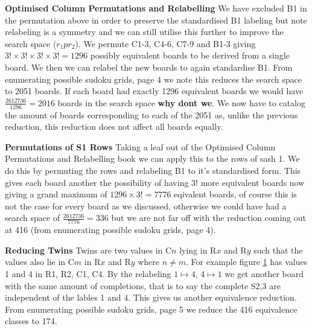 \documentclass[a4paper,11pt]{report}
\newcounter{row}
\newcounter{col}
\newcounter{rowb}
\newcounter{colb}
\newcommand\setrowb[3]{
  \setcounter{colb}{1}
  \foreach \n in {#1, #2, #3} {
    \edef\x{\value{colb} - 0.5}
    \edef\y{3.5 - \value{rowb}}
    \node[anchor=center] at (\x, \y) {\n};
    \stepcounter{colb}
  }
  \stepcounter{rowb}
}
\begin{document}
\textbf{Optimised Column Permutations and Relabelling}
We have excluded B1 in the permutation above in order to preserve the standardised B1 labeling but note relabeling is a symmetry and we can still utilise this further to improve the search space ($r_1pr_2$). We permute C1-3, C4-6, C7-9 and B1-3 giving $3!\times 3!\times 3! \times 3!=1296$ possibly equivalent boards to be derived from a single board. We then we can relabel the new boards to again standardise B1. From \cite{}enumerating possible sudoku grids, page 4 we note this reduces the search space to 2051 boards. If each board had exactly 1296 equivalent boards we would have $\frac{2612736}{1296}= 2016$ boards in the search space \textbf{why dont we}.  We now have to catalog the amount of boards corresponding to each of the 2051 as, unlike the previous reduction, this reduction does not affect all boards equally.

\textbf{Permutations of S1 Rows}
Taking a leaf out of the Optimised Column Permutations and Relabelling book we can apply this to the rows of sash 1. We do this by permuting the rows and relabeling B1 to it's standardised form. This gives each board another the possibility of having $3!$ more equivalent boards now giving a grand maximum of $1296\times 3!=7776$ eqivalent boards, of course this is not the case for every board as we discussed, otherwise we could have had a search space of $\frac{2612736}{7776}=336$ but we are not far off with the reduction coming out at 416 (from \cite{}enumerating possible sudoku grids, page 4).

\textbf{Reducing Twins}
Twins are two values in C$n$ lying in R$x$ and R$y$ such that the values also lie in C$m$ in R$x$ and R$y$ where $n\neq m$. For example figure \ref{fig:twins} has values 1 and 4 in R1, R2, C1, C4. By the relabeling $1\mapsto 4$, $4\mapsto 1$ we get another board with the same amount of completions, that is to say the complete S2,3 are independent of the lables 1 and 4. This gives us another equivalence reduction. From \cite{}enumerating possible sudoku grids, page 5 we reduce the 416 equivalence classes to 174.

\begin{figure}[h!]
\centering
{}
\caption{\label{fig:twins}}
\end{figure}
\end{document}
